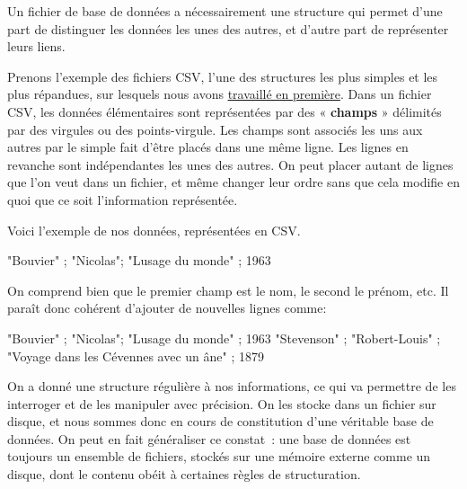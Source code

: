 \documentclass[
  a4paper,
  DIV=11,
  numbers=noendperiod]{scrartcl}
\newenvironment{Shaded}{\begin{snugshade}}{\end{snugshade}}
\newcommand{\CommentTok}[1]{\textcolor[rgb]{0.37,0.37,0.37}{#1}}
\newcommand{\DecValTok}[1]{\textcolor[rgb]{0.68,0.00,0.00}{#1}}
\newcommand{\OperatorTok}[1]{\textcolor[rgb]{0.37,0.37,0.37}{#1}}
\newcommand{\StringTok}[1]{\textcolor[rgb]{0.13,0.47,0.30}{#1}}
\begin{document}
Un fichier de base de données a nécessairement une structure qui permet
d'une part de distinguer les données les unes des autres, et d'autre
part de représenter leurs liens.

Prenons l'exemple des fichiers CSV, l'une des structures les plus
simples et les plus répandues, sur lesquels nous avons
\href{https://flallemand.fr/nsi/premiere/07_tables/tables_cours/}{travaillé
en première}. Dans un fichier CSV, les données élémentaires sont
représentées par des « \textbf{champs} » délimités par des virgules ou
des points-virgule. Les champs sont associés les uns aux autres par le
simple fait d'être placés dans une même ligne. Les lignes en revanche
sont indépendantes les unes des autres. On peut placer autant de lignes
que l'on veut dans un fichier, et même changer leur ordre sans que cela
modifie en quoi que ce soit l'information représentée.

Voici l'exemple de nos données, représentées en CSV.

\begin{Shaded}
\begin{Highlighting}[]
\CommentTok{"Bouvier"} \OperatorTok{;} \StringTok{"Nicolas"}\OperatorTok{;} \StringTok{"L\textquotesingle{}usage du monde"} \OperatorTok{;} \DecValTok{1963}
\end{Highlighting}
\end{Shaded}

On comprend bien que le premier champ est le nom, le second le prénom,
etc. Il paraît donc cohérent d'ajouter de nouvelles lignes comme:

\begin{Shaded}
\begin{Highlighting}[]
\CommentTok{"Bouvier"}   \OperatorTok{;} \StringTok{"Nicolas"}\OperatorTok{;} \StringTok{"L\textquotesingle{}usage du monde"} \OperatorTok{;} \DecValTok{1963}
\CommentTok{"Stevenson"} \OperatorTok{;} \StringTok{"Robert{-}Louis"}  \OperatorTok{;} \StringTok{"Voyage dans les Cévennes avec un âne"} \OperatorTok{;} \DecValTok{1879}
\end{Highlighting}
\end{Shaded}

On a donné une structure régulière à nos informations, ce qui va
permettre de les interroger et de les manipuler avec précision. On les
stocke dans un fichier sur disque, et nous sommes donc en cours de
constitution d'une véritable base de données. On peut en fait
généraliser ce constat~: une base de données est toujours un ensemble de
fichiers, stockés sur une mémoire externe comme un disque, dont le
contenu obéit à certaines règles de structuration.
\end{document}
